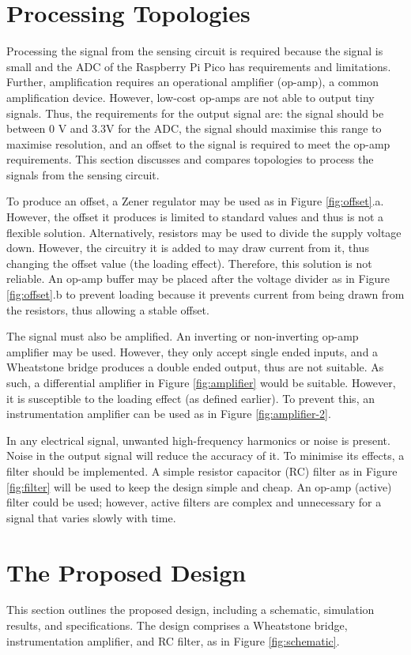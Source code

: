 \section{Processing Topologies}

Processing the signal from the sensing circuit is required because the signal is small and the ADC of the Raspberry Pi Pico has requirements and limitations. Further, amplification requires an operational amplifier (op-amp), a common amplification device. However, low-cost op-amps are not able to output tiny signals. Thus, the requirements for the output signal are: the signal should be between 0 V and 3.3V for the ADC, the signal should maximise this range to maximise resolution, and an offset to the signal is required to meet the op-amp requirements. This section discusses and compares topologies to process the signals from the sensing circuit.

To produce an offset, a Zener regulator may be used as in Figure \ref{fig:offset}.a. However, the offset it produces is limited to standard values and thus is not a flexible solution. Alternatively, resistors may be used to divide the supply voltage down. However, the circuitry it is added to may draw current from it, thus changing the offset value (the loading effect). Therefore, this solution is not reliable. An op-amp buffer may be placed after the voltage divider as in Figure \ref{fig:offset}.b to prevent loading because it prevents current from being drawn from the resistors, thus allowing a stable offset.

The signal must also be amplified. An inverting or non-inverting op-amp amplifier may be used. However, they only accept single ended inputs, and a Wheatstone bridge produces a double ended output, thus are not suitable. As such, a differential amplifier in Figure \ref{fig:amplifier} would be suitable. However, it is susceptible to the loading effect (as defined earlier). To prevent this, an instrumentation amplifier can be used as in Figure \ref{fig:amplifier-2}.

In any electrical signal, unwanted high-frequency harmonics or noise is present. Noise in the output signal will reduce the accuracy of it. To minimise its effects, a filter should be implemented. A simple resistor capacitor (RC) filter as in Figure \ref{fig:filter} will be used to keep the design simple and cheap. An op-amp (active) filter could be used; however, active filters are complex and unnecessary for a signal that varies slowly with time.


\section{The Proposed Design}
This section outlines the proposed design, including a schematic, simulation results, and specifications. The design comprises a Wheatstone bridge, instrumentation amplifier, and RC filter, as in Figure \ref{fig:schematic}.

